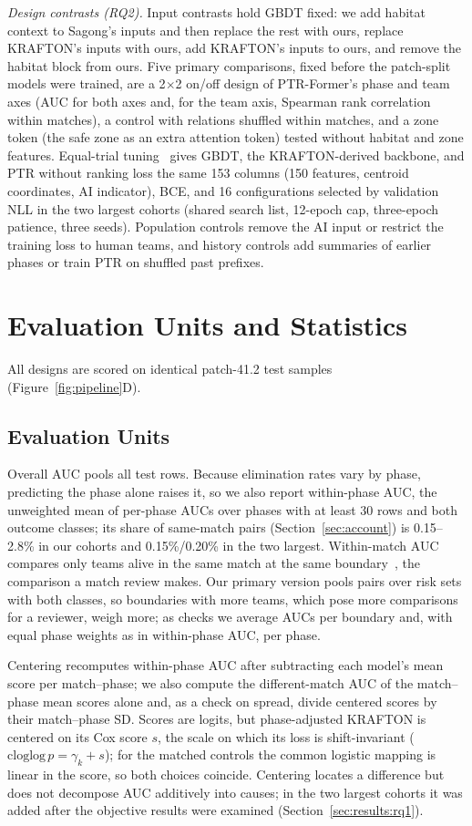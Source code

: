 \documentclass[sigconf,anonymous,nonacm]{acmart}
\begin{document}
\emph{Design contrasts (RQ2).} Input contrasts hold GBDT fixed: we add habitat context to Sagong's inputs and then replace the rest with ours, replace KRAFTON's inputs with ours, add KRAFTON's inputs to ours, and remove the habitat block from ours. Five primary comparisons, fixed before the patch-split models were trained, are a 2$\times$2 on/off design of PTR-Former's phase and team axes (AUC for both axes and, for the team axis, Spearman rank correlation within matches), a control with relations shuffled within matches, and a zone token (the safe zone as an extra attention token) tested without habitat and zone features. Equal-trial tuning~\cite{Bergstra12,Cawley10} gives GBDT, the KRAFTON-derived backbone, and PTR without ranking loss the same 153 columns (150 features, centroid coordinates, AI indicator), BCE, and 16 configurations selected by validation NLL in the two largest cohorts (shared search list, 12-epoch cap, three-epoch patience, three seeds). Population controls remove the AI input or restrict the training loss to human teams, and history controls add summaries of earlier phases or train PTR on shuffled past prefixes.

\section{Evaluation Units and Statistics}
\label{sec:method:evaluation}
All designs are scored on identical patch-41.2 test samples (Figure~\ref{fig:pipeline}D).

\subsection{Evaluation Units}
\label{sec:method:units}
Overall AUC pools all test rows. Because elimination rates vary by phase, predicting the phase alone raises it, so we also report within-phase AUC, the unweighted mean of per-phase AUCs over phases with at least 30 rows and both outcome classes; its share of same-match pairs (Section~\ref{sec:account}) is 0.15--2.8\% in our cohorts and 0.15\%/0.20\% in the two largest. Within-match AUC compares only teams alive in the same match at the same boundary~\cite{HeagertyZheng05,vanKlaveren14}, the comparison a match review makes. Our primary version pools pairs over risk sets with both classes, so boundaries with more teams, which pose more comparisons for a reviewer, weigh more; as checks we average AUCs per boundary and, with equal phase weights as in within-phase AUC, per phase.

Centering recomputes within-phase AUC after subtracting each model's mean score per match--phase; we also compute the different-match AUC of the match--phase mean scores alone and, as a check on spread, divide centered scores by their match--phase SD. Scores are logits, but phase-adjusted KRAFTON is centered on its Cox score $s$, the scale on which its loss is shift-invariant ($\mathrm{cloglog}\,p=\gamma_k+s$); for the matched controls the common logistic mapping is linear in the score, so both choices coincide. Centering locates a difference but does not decompose AUC additively into causes; in the two largest cohorts it was added after the objective results were examined (Section~\ref{sec:results:rq1}).
\end{document}

